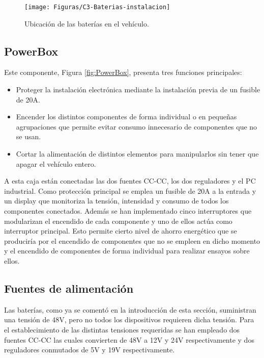 \begin{figure}[!ht]
  \centering
    \texttt{[image: Figuras/C3-Baterias-instalacion]}
  \caption{Ubicación de las baterías en el vehículo.}
  \label{fig:baterias-asientos}
\end{figure}

\subsection{PowerBox}
Este componente, Figura \ref{fig:PowerBox}, presenta tres funciones principales:
\begin{itemize}
\item Proteger la instalación electrónica mediante la instalación previa de un fusible de 20A.

\item Encender los distintos componentes de forma individual o en pequeñas agrupaciones que permite evitar consumo innecesario de componentes que no se usan.

\item Cortar la alimentación de distintos elementos para manipularlos sin tener que apagar el vehículo entero.
\end{itemize}

A esta caja están conectadas las dos fuentes CC-CC, los dos reguladores y el PC industrial. Como protección principal se emplea un fusible de 20A a la entrada y un display que monitoriza la tensión, intensidad y consumo de todos los componentes conectados. Además se han implementado cinco interruptores que modularizan el encendido de cada componente y uno de ellos actúa como interruptor principal. Esto permite cierto nivel de ahorro energético que se produciría por el encendido de componentes que no se empleen en dicho momento y el encendido de componentes de forma individual para realizar ensayos sobre ellos.  

\subsection{Fuentes de alimentación}
Las baterías, como ya se comentó en la introducción de esta sección, suministran una tensión de 48V, pero no todos los dispositivos requieren dicha tensión. Para el establecimiento de las distintas tensiones requeridas se han empleado dos fuentes CC-CC las cuales convierten de 48V a 12V y 24V respectivamente y dos reguladores conmutados de 5V y 19V respectivamente. 

